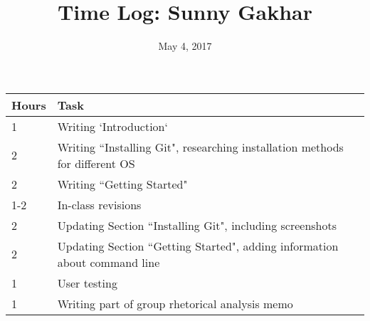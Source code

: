 \documentclass{article}
\title{Time Log: Sunny Gakhar}
\date{May 4, 2017}
\begin{document}
\maketitle

\begin{table}[h]
\centering
\label{my-label}
\begin{tabular}{ll}
\textbf{Hours} & \textbf{Task}            \\ \hline
1     & Writing `Introduction`         \\
2     & Writing ``Installing Git", researching installation methods for different OS    \\
2     & Writing ``Getting Started"\\
1-2  & In-class revisions	\\
2		& Updating Section ``Installing Git", including screenshots\\
2		& Updating Section ``Getting Started", adding information about command line \\
1		& User testing	\\
1		& Writing part of group rhetorical analysis memo
\end{tabular}
\end{table}
\end{document}
